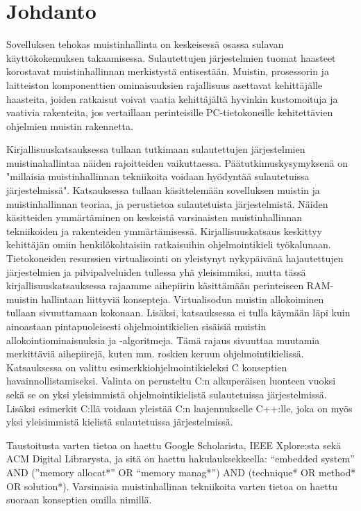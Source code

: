 \chapter{Johdanto} \label{Johdanto}

Sovelluksen tehokas muistinhallinta on keskeisessä osassa sulavan käyttökokemuksen takaamisessa. Sulautettujen järjestelmien tuomat haasteet korostavat muistinhallinnan merkistystä entisestään. Muistin, prosessorin ja laitteiston komponenttien ominaisuuksien rajallisuus asettavat kehittäjälle haasteita, joiden ratkaisut voivat vaatia kehittäjältä hyvinkin kustomoituja ja vaativia rakenteita, jos vertaillaan perinteisille PC-tietokoneille kehitettävien ohjelmien muistin rakennetta.

Kirjallisuuskatsauksessa tullaan tutkimaan sulautettujen järjestelmien muistinahallintaa näiden rajoitteiden vaikuttaessa. Päätutkimuskysymyksenä on "millaisia muistinhallinnan tekniikoita voidaan hyödyntää sulautetuissa järjestelmissä". Katsauksessa tullaan käsittelemään sovelluksen muistin ja muistinhallinnan teoriaa, ja perustietoa sulautetuista järjestelmistä. Näiden käsitteiden ymmärtäminen on keskeistä varsinaisten muistinhallinnan tekniikoiden ja rakenteiden ymmärtämisessä. Kirjallisuuskatsaus keskittyy kehittäjän omiin henkilökohtaisiin ratkaisuihin ohjelmointikieli työkalunaan. Tietokoneiden resurssien virtualisointi on yleistynyt nykypäivänä hajautettujen järjestelmien ja pilvipalveluiden tullessa yhä yleisimmiksi, mutta tässä kirjallisuuskatsauksessa rajaamme aihepiirin käsittämään perinteiseen RAM-muistin hallintaan liittyviä konsepteja. Virtualisodun muistin allokoiminen tullaan sivuuttamaan kokonaan. Lisäksi, katsauksessa ei tulla käymään läpi kuin ainoastaan pintapuoleisesti ohjelmointikielien sisäisiä muistin allokointiominaisuuksia ja -algoritmeja. Tämä rajaus sivuuttaa muutamia merkittäviä aihepiirejä, kuten mm. roskien keruun ohjelmointikielissä. Katsauksessa on valittu esimerkkiohjelmointikieleksi C konseptien havainnollistamiseksi. Valinta on perusteltu C:n alkuperäisen luonteen vuoksi sekä se on yksi yleisimmistä ohjelmointikielistä sulautetuissa järjestelmissä. Lisäksi esimerkit C:llä voidaan yleistää C:n laajennukselle C++:lle, joka on myös yksi yleisimmistä kielistä sulautetuissa järjestelmissä.

Taustoitusta varten tietoa on haettu Google Scholarista, IEEE Xplore:sta sekä ACM Digital Librarysta, ja sitä on haettu hakulauksekkeella: “embedded system” AND (”memory allocat*” OR “memory manag*”) AND (technique* OR method* OR solution*). Varsinaisia muistinhallinan tekniikoita varten tietoa on haettu suoraan konseptien omilla nimillä.